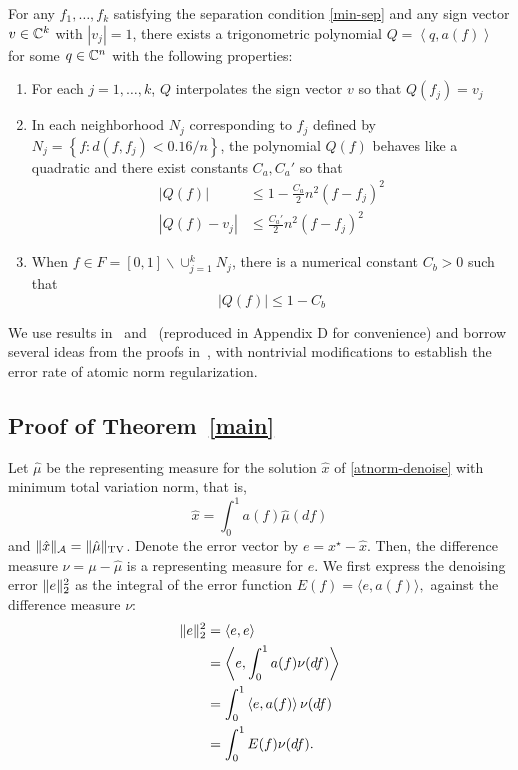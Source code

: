 \begin{theorem}
\label{dual-stab} For any $f_1, \ldots, f_k$ satisfying the separation condition \eqref{min-sep} and any sign vector $v \in \mathbb{C}^k$ with $|v_j|=1$, there exists a trigonometric polynomial $Q = \left<q, a(f)\right>$ for some $q \in \mathbb{C}^n$ with the following properties: 
\begin{enumerate}
\item For each $j = 1, \ldots, k$, $Q$ interpolates the sign vector $v$ so that $Q(f_j) = v_j$
\item In each neighborhood $N_j$ corresponding to $f_j$ defined by
$N_j = \left\{ f : d(f, f_j) < {0.16}/{n} \right\}$, 
the polynomial $Q(f)$ behaves like a quadratic and there exist constants $C_a, C_a'$ so that
\begin{align}
\label{q1}|Q(f)| & \leq 1 - \frac{C_a}{2} n^2 (f-f_j)^2\\
\label{q2}|Q(f) - v_j| & \leq \frac{C_a'}{2} n^2 (f - f_j)^2
\end{align}
\item When $f \in F = [0,1] \backslash \cup_{j=1}^k{N_j}$, there is a numerical constant $C_b>0$ such that
\[
|Q(f)| \leq 1 - C_b
\]
\end{enumerate}
\end{theorem}

We use results in~\cite{cg_noisy} and~\cite{btr12} (reproduced in Appendix D for convenience) and borrow several ideas from the proofs in~\cite{cg_noisy}, with nontrivial modifications to establish the error rate of atomic norm regularization.

\subsection{Proof of Theorem~\ref{main}}
Let $\hat{\mu}$ be the representing measure for the solution $\hat{x}$  of \eqref{atnorm-denoise} with minimum total variation norm, that is,
\[
\hat{x} = \int_0^1 a(f) \hat{\mu}(df)
\]
and $\lVert\hat{x}\rVert_{\mathcal{A}} = \lVert\hat{\mu}\rVert_{\mathrm{TV}}$. Denote the error vector by $e = x^\star - \hat{x}$. 
Then, the difference measure $\nu = \mu - \hat{\mu}$ is a representing measure for $e$. We first express the denoising error $\lVert e\rVert_2^2$ as the integral of the error function $E(f) = \langle e, a(f) \rangle,$ against the difference measure $\nu$:
\begin{align*}
\lVert e\rVert_2^2 &= \langle e, e \rangle\\
& = \left\langle e, \int_0^1 a(f) \nu(df) \right\rangle\\
& =  \int_0^1  \left\langle e,a(f) \right\rangle \nu(df)\\
& = \int_0^1 E(f) \nu(df).
\end{align*}


